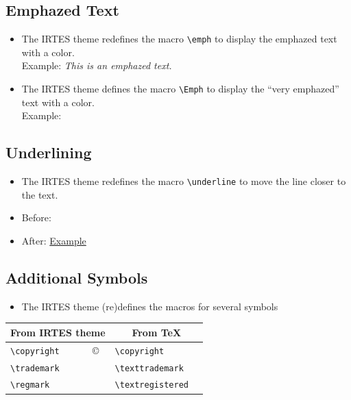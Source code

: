 \documentclass[english,circlenumberstyle]{irtesbeamer}
\begin{document}
\subsection{Emphazed Text}

\begin{frame}{\subsecname}
	\begin{itemize}
	\item The IRTES theme redefines the macro \texttt{{\textbackslash}emph} to display the emphazed text with a color. \\
		Example: \emph{This is an emphazed text.}
	\item The IRTES theme defines the macro \texttt{{\textbackslash}Emph} to display the ``very emphazed'' text with a color. \\
		Example: 
	\end{itemize}
\end{frame}

\subsection{Underlining}

\makeatletter
\begin{frame}{\subsecname}
	\begin{itemize}
	\item The IRTES theme redefines the macro \texttt{{\textbackslash}underline} to move the line closer to the text.
	\item Before: 
	\item After: \underline{Example}
	\end{itemize}
\end{frame}
\makeatother

\subsection{Additional Symbols}
\begin{frame}{\subsecname}
	\begin{itemize}
	\item The IRTES theme (re)defines the macros for several symbols
	\end{itemize}
	\begin{tabularx}{\linewidth}{|l|X|l|X|}
	\hline
	\multicolumn{2}{|c|}{\textbf{From IRTES theme}} & \multicolumn{2}{c|}{\textbf{From \TeX}} \\
	\hline
	\texttt{{\textbackslash}copyright} & \copyright & \texttt{{\textbackslash}copyright} & \textcopyright \\
	\hline
	\texttt{{\textbackslash}trademark} & \trademark & \texttt{{\textbackslash}texttrademark} & \texttrademark \\
	\hline
	\texttt{{\textbackslash}regmark} & \regmark & \texttt{{\textbackslash}textregistered} & \textregistered \\
	\hline
	\end{tabularx}
\end{frame}
\end{document}
